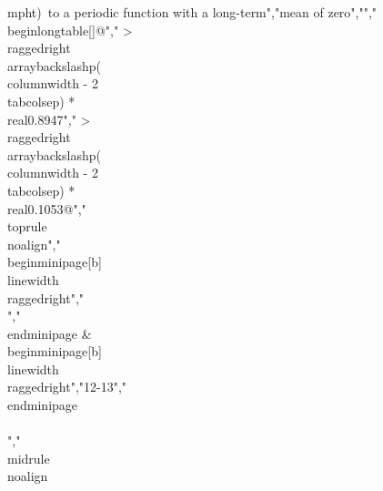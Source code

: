 {{{{{{{{{{mph{t})~to a periodic function with a long-term","mean of zero","","\\begin{longtable}[]{@{}","  >{\\raggedright\\arraybackslash}p{(\\columnwidth - 2\\tabcolsep) * \\real{0.8947}}","  >{\\raggedright\\arraybackslash}p{(\\columnwidth - 2\\tabcolsep) * \\real{0.1053}}@{}}","\\toprule\\noalign{}","\\begin{minipage}[b]{\\linewidth}\\raggedright","\\[\\begin{array}{r}","\\frac{\\partial\\varphi}{\\partial t} = \\sum_{i = 1}^{i = N}{k_{i}\\omega_{i}\\cos(\\omega_{i}t)}","\\end{array}\\]","\\end{minipage} & \\begin{minipage}[b]{\\linewidth}\\raggedright","12-13","\\end{minipage} \\\\","\\midrule\\noalign{}}}}}}}}}}}
